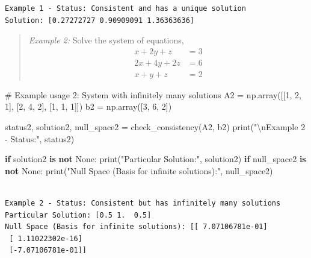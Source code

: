 \documentclass[
  letterpaper,
  DIV=11,
  numbers=noendperiod]{scrreprt}
\newenvironment{Shaded}{\begin{snugshade}}{\end{snugshade}}
\newcommand{\BuiltInTok}[1]{\textcolor[rgb]{0.00,0.23,0.31}{#1}}
\newcommand{\CharTok}[1]{\textcolor[rgb]{0.13,0.47,0.30}{#1}}
\newcommand{\CommentTok}[1]{\textcolor[rgb]{0.37,0.37,0.37}{#1}}
\newcommand{\ControlFlowTok}[1]{\textcolor[rgb]{0.00,0.23,0.31}{\textbf{#1}}}
\newcommand{\DecValTok}[1]{\textcolor[rgb]{0.68,0.00,0.00}{#1}}
\newcommand{\KeywordTok}[1]{\textcolor[rgb]{0.00,0.23,0.31}{\textbf{#1}}}
\newcommand{\NormalTok}[1]{\textcolor[rgb]{0.00,0.23,0.31}{#1}}
\newcommand{\OperatorTok}[1]{\textcolor[rgb]{0.37,0.37,0.37}{#1}}
\newcommand{\StringTok}[1]{\textcolor[rgb]{0.13,0.47,0.30}{#1}}
\newcommand{\VariableTok}[1]{\textcolor[rgb]{0.07,0.07,0.07}{#1}}
\theoremstyle{plain}
\theoremstyle{definition}
\theoremstyle{remark}
\begin{document}
\begin{verbatim}
Example 1 - Status: Consistent and has a unique solution
Solution: [0.27272727 0.90909091 1.36363636]
\end{verbatim}

\begin{quote}
\emph{Example 2:} Solve the system of equations, \begin{align*}
x+2y+z&=3\\
2x+4y+2z&=6\\
x+y+z&=2
\end{align*}
\end{quote}

\begin{Shaded}
\begin{Highlighting}[]
\CommentTok{\# Example usage 2: System with infinitely many solutions}
\NormalTok{A2 }\OperatorTok{=}\NormalTok{ np.array([[}\DecValTok{1}\NormalTok{, }\DecValTok{2}\NormalTok{, }\DecValTok{1}\NormalTok{], [}\DecValTok{2}\NormalTok{, }\DecValTok{4}\NormalTok{, }\DecValTok{2}\NormalTok{], [}\DecValTok{1}\NormalTok{, }\DecValTok{1}\NormalTok{, }\DecValTok{1}\NormalTok{]])}
\NormalTok{b2 }\OperatorTok{=}\NormalTok{ np.array([}\DecValTok{3}\NormalTok{, }\DecValTok{6}\NormalTok{, }\DecValTok{2}\NormalTok{])}

\NormalTok{status2, solution2, null\_space2 }\OperatorTok{=}\NormalTok{ check\_consistency(A2, b2)}
\BuiltInTok{print}\NormalTok{(}\StringTok{"}\CharTok{\textbackslash{}n}\StringTok{Example 2 {-} Status:"}\NormalTok{, status2)}

\ControlFlowTok{if}\NormalTok{ solution2 }\KeywordTok{is} \KeywordTok{not} \VariableTok{None}\NormalTok{:}
    \BuiltInTok{print}\NormalTok{(}\StringTok{"Particular Solution:"}\NormalTok{, solution2)}
\ControlFlowTok{if}\NormalTok{ null\_space2 }\KeywordTok{is} \KeywordTok{not} \VariableTok{None}\NormalTok{:}
    \BuiltInTok{print}\NormalTok{(}\StringTok{"Null Space (Basis for infinite solutions):"}\NormalTok{, null\_space2)}
\end{Highlighting}
\end{Shaded}

\begin{verbatim}

Example 2 - Status: Consistent but has infinitely many solutions
Particular Solution: [0.5 1.  0.5]
Null Space (Basis for infinite solutions): [[ 7.07106781e-01]
 [ 1.11022302e-16]
 [-7.07106781e-01]]
\end{verbatim}

\end{document}
